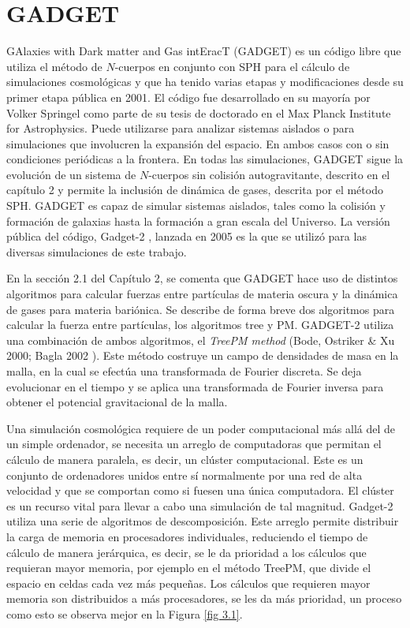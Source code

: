\documentclass[a4paper,openright,12pt]{book}
\begin{document}
\chapter{GADGET}\label{GADGET}
GAlaxies with Dark matter and Gas intEracT (GADGET) es un código libre que utiliza el método de $N$-cuerpos en conjunto con SPH para el cálculo de simulaciones cosmológicas y que ha tenido varias etapas y modificaciones desde su primer etapa pública en 2001. El código fue desarrollado en su mayoría por Volker Springel \cite{b4} como parte de su tesis de doctorado en el Max Planck Institute for Astrophysics. Puede utilizarse para analizar sistemas aislados o para simulaciones que involucren la expansión del espacio. En ambos casos con o sin condiciones periódicas a la frontera. En todas las simulaciones, GADGET sigue la evolución de un sistema de $N$-cuerpos sin colisión autogravitante, descrito en el capítulo 2 y permite la inclusión de dinámica de gases, descrita por el método SPH.
GADGET es capaz de simular sistemas aislados, tales como la colisión y formación de galaxias hasta la formación a gran escala del Universo. La versión pública del código, Gadget-2 \cite{b10}, lanzada en 2005 es la que se utilizó para las diversas simulaciones de este trabajo.

En la sección 2.1 del Capítulo 2, se comenta que GADGET hace uso de distintos algoritmos para calcular fuerzas entre partículas de materia oscura y la dinámica de gases para materia bariónica. Se describe de forma breve dos algoritmos para calcular la fuerza entre partículas, los algoritmos tree y PM. GADGET-2 utiliza una combinación de ambos algoritmos, el \textit{TreePM method} (Bode, Ostriker \& Xu 2000; Bagla 2002 \cite{3.0.1, 3.0.2}). Este método costruye un campo de densidades de masa en la malla, en la cual se efectúa una transformada de Fourier discreta. Se deja evolucionar en el tiempo y se aplica una transformada de Fourier inversa para obtener el potencial gravitacional de la malla.

Una simulación cosmológica requiere de un poder computacional más allá del de un simple ordenador, se necesita un arreglo de computadoras que permitan el cálculo de manera paralela, es decir, un clúster computacional. Este es un conjunto de ordenadores unidos entre sí normalmente por una red de alta velocidad y que se comportan como si fuesen una única computadora. El clúster es un recurso vital para llevar a cabo una simulación de tal magnitud. Gadget-2 utiliza una serie de algoritmos de descomposición. Este arreglo permite distribuir la carga de memoria en procesadores individuales, reduciendo el tiempo de cálculo de manera jerárquica, es decir, se le da prioridad a los cálculos que requieran mayor memoria, por ejemplo en el método TreePM, que divide el espacio en celdas cada vez más pequeñas. Los cálculos que requieren mayor memoria son distribuidos a más procesadores, se les da más prioridad, un proceso como esto se observa mejor en la Figura \ref{fig 3.1}.
\end{document}
